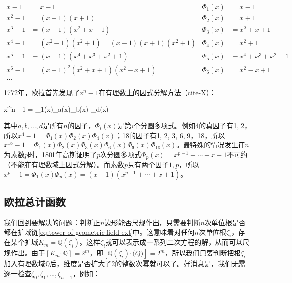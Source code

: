 \begin{align*}
x - 1 &= x - 1 & \Phi_1(x) &= x - 1 \\
x^2 - 1 &= (x - 1)(x + 1) & \Phi_2(x) &= x + 1 \\
x^3 - 1 &= (x - 1)(x^2 + x + 1) & \Phi_3(x) &= x^2 + x + 1 \\
x^4 - 1 &= (x^2 - 1)(x^2 + 1) = (x - 1)(x + 1)(x^2 + 1) & \Phi_4(x) &= x^2 + 1 \\
x^5 - 1 &= (x - 1)(x^4 + x^3 + x^2 + 1) & \Phi_5(x) &= x^4 + x^3 + x^2 + 1 \\
x^6 - 1 &= (x - 1)^2(x^2 + x + 1)(x^2 - x + 1) & \Phi_6(x) &= x^2 - x + 1 \\
\dotso
\end{align*}

1772年，欧拉首先发现了$x^n - 1$在有理数上的因式分解方法（cite-X）：

\be
x^n - 1 = \Phi_1(x)\Phi_a(x)\Phi_b(x) \dotsm \Phi_d(x)
\ee

其中$a, b, \dotsc, d$是所有$n$的因子，$\Phi_i(x)$是第$i$个分圆多项式。例如4的真因子有1, 2，所以$x^4 - 1 = \Phi_1(x)\Phi_2(x)\Phi_4(x)$；18的因子有1, 2, 3, 6, 9，18，所以$x^{18} - 1 = \Phi_1(x)\Phi_2(x)\Phi_3(x)\Phi_6(x)\Phi_9(x)\Phi_{18}(x)$。最特殊的情况发生在$n$为素数$p$时，1801年高斯证明了$p$次分圆多项式$\Phi_p(x) = x^{p-1} + \dotsb + x + 1$不可约（不能在有理数域上因式分解）。而素数$p$只有两个因子$1, p$，所以$x^p - 1 = \Phi_1(x)\Phi_p(x) = (x - 1)(x^{p-1} + \dotsb + x + 1)$。

\subsection{欧拉总计函数}
我们回到要解决的问题：判断正$n$边形能否尺规作出，只需要判断$n$次单位根是否都在扩域链\cref{eq:tower-of-geometric-field-ext}中。这意味着对任何$n$次单位根$\zeta_i$，存在某个扩域$K_m = \mathbb{Q}(\zeta_i)$。这样$\zeta_i$就可以表示成一系列二次方程的解，从而可以尺规作出。由于$[K_m : \mathbb{Q}] = 2^m$，即$[\mathbb{Q}(\zeta_i) : \mathbb(Q)] = 2^m$，所以我们只要判断把根$\zeta_i$加入有理数域$\mathbb{Q}$后，维度是否扩大了2的整数次幂就可以了。好消息是，我们无需逐一检查$\zeta_0, \zeta_1, \dotsc, \zeta_{n-1}$，例如：


